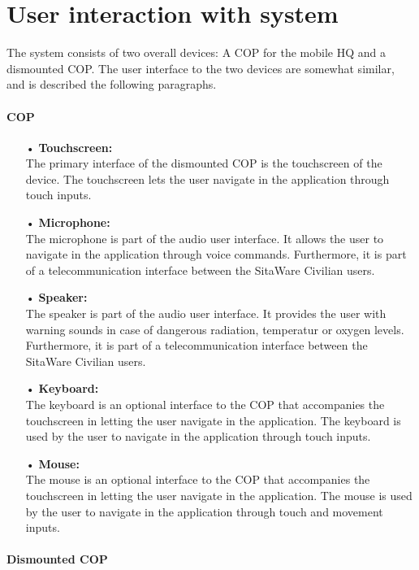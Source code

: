 \section{User interaction with system}

The system consists of two overall devices: A COP for the mobile HQ and a dismounted COP. The user interface to the two devices are somewhat similar, and is described the following paragraphs. 

\paragraph{COP}
\begin{enumerate}
\item[•] \textbf{Touchscreen:} \\
The primary interface of the dismounted COP is the touchscreen of the device. The touchscreen lets the user navigate in the application through touch inputs. 

\item[•] \textbf{Microphone:} \\
The microphone is part of the audio user interface. It allows the user to navigate in the application through voice commands. Furthermore, it is part of a telecommunication interface between the SitaWare Civilian users. 

\item[•] \textbf{Speaker:} \\
The speaker is part of the audio user interface. It provides the user with warning sounds in case of dangerous radiation, temperatur or oxygen levels. Furthermore, it is part of a telecommunication interface between the SitaWare Civilian users.

\item[•] \textbf{Keyboard:}\\
The keyboard is an optional interface to the COP that accompanies the touchscreen in letting the user navigate in the application. The keyboard is used by the user to navigate in the application through touch inputs. 

\item[•] \textbf{Mouse:}\\
The mouse is an optional interface to the COP that accompanies the touchscreen in letting the user navigate in the application. The mouse is used by the user to navigate in the application through touch and movement inputs. 
\end{enumerate}


\paragraph{Dismounted COP}

